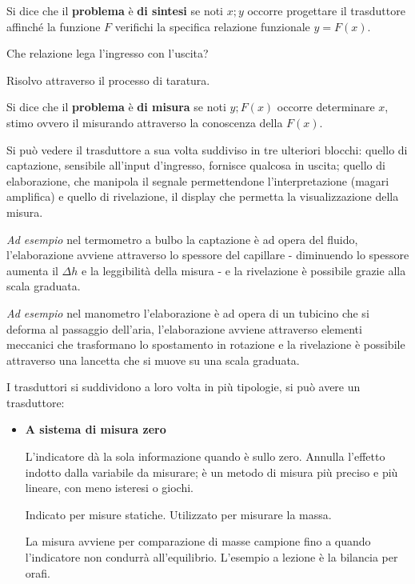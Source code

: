 \documentclass[a4paper, 15pt]{article}
\begin{document}
\begin{adjustwidth}{2in}{}
	Si dice che il \textbf{problema} è \textbf{di sintesi} se noti $x; y$ occorre progettare il trasduttore affinché la funzione $F$ verifichi la specifica relazione funzionale $y = F(x)$.
	
	Che relazione lega l'ingresso con l'uscita? 
	
	Risolvo attraverso il processo di taratura. \newline 
	
	Si dice che il \textbf{problema} è \textbf{di misura} se noti $y; F(x)$ occorre determinare $x$, stimo ovvero il misurando attraverso la conoscenza della $F(x)$. \newline 
	
	Si può vedere il trasduttore a sua volta suddiviso in tre ulteriori blocchi: quello di captazione, sensibile all'input d'ingresso, fornisce qualcosa in uscita; quello di elaborazione, che manipola il segnale permettendone l'interpretazione (magari amplifica) e quello di rivelazione, il display che permetta la visualizzazione della misura. \newline 
	
	\textit{Ad esempio} nel termometro a bulbo la captazione è ad opera del fluido, l'elaborazione avviene attraverso lo spessore del capillare - diminuendo lo spessore aumenta il $\Delta h$ e la leggibilità della misura - e la rivelazione è possibile grazie alla scala graduata. 
	
	\textit{Ad esempio} nel manometro l'elaborazione è ad opera di un tubicino che si deforma al passaggio dell'aria, l'elaborazione avviene attraverso elementi meccanici che trasformano lo spostamento in rotazione e la rivelazione è possibile attraverso una lancetta che si muove su una scala graduata. 
	
	I trasduttori si suddividono a loro volta in più tipologie, si può avere un trasduttore: 
	\begin{itemize}
		\item \textbf{A sistema di misura zero} 
		 
		L'indicatore dà la sola informazione quando è sullo zero. Annulla l’effetto indotto dalla variabile da misurare; è un metodo di misura più preciso e più lineare, con meno isteresi o giochi.
		
		Indicato per misure statiche. Utilizzato per misurare la massa.
		
		La misura avviene per comparazione di masse campione fino a quando l'indicatore non condurrà all'equilibrio. L'esempio a lezione è la bilancia per orafi.
		

\end{itemize}
\end{adjustwidth}
\end{document}
